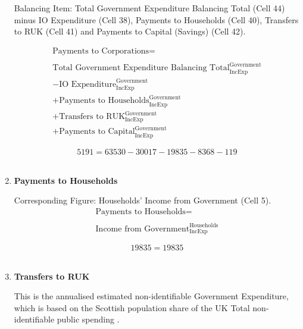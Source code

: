 \begin{enumerate}
Balancing Item: Total Government Expenditure Balancing Total (Cell 44) minus IO Expenditure (Cell 38), Payments to Households (Cell 40), Transfers to RUK (Cell 41) and Payments to Capital (Savings) (Cell 42).

\begin{equation}
\begin{split}
\text{Payments to Corporations} =  \\ \\
\text{Total Government Expenditure Balancing Total}^\text{Government}_\text{IncExp}\\
-\text{IO Expenditure}^\text{Government}_\text{IncExp}\\
+\text{Payments to Households}^\text{Government}_\text{IncExp}\\
+\text{Transfers to RUK}^\text{Government}_\text{IncExp}\\
+\text{Payments to Capital}^\text{Government}_\text{IncExp}
\end{split} \label{eq:2.5.43}
\end{equation}

\begin{equation} \nonumber
5191 = 63530-30017-19835-8368-119
\end{equation}\\


\item \textbf {Payments to Households}

Corresponding Figure: Households' Income from Government (Cell 5).\\

\begin{equation}
\begin{split}
\text{Payments to Households} =  \\ \\
\text{Income from Government}^\text{Households}_\text{IncExp}
\end{split} \label{eq:2.5.44}
\end{equation}

\begin{equation} \nonumber
19835 = 19835
\end{equation}\\


\item \textbf {Transfers to RUK}

This is the annualised estimated non-identifiable Government Expenditure, which is based on the Scottish population share of the UK Total non-identifiable public spending \cite{ScotGov2013b}.


\end{enumerate}

